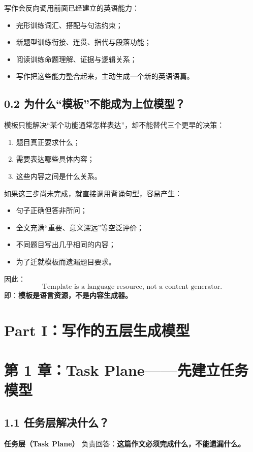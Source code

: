 \documentclass[11pt,a4paper]{ctexart}
\newcommand{\kw}[1]{\textbf{#1}}
\newcommand{\term}[2]{\textbf{#1（#2）}}
\begin{document}
\begin{bridge}[与阅读类专题的接口]
写作会反向调用前面已经建立的英语能力：
\begin{itemize}
  \item 完形训练词汇、搭配与句法约束；
  \item 新题型训练衔接、连贯、指代与段落功能；
  \item 阅读训练命题理解、证据与逻辑关系；
  \item 写作把这些能力整合起来，主动生成一个新的英语语篇。
\end{itemize}
\end{bridge}

\subsection{0.2 为什么“模板”不能成为上位模型？}
模板只能解决“某个功能通常怎样表达”，却不能替代三个更早的决策：
\begin{enumerate}
  \item 题目真正要求什么；
  \item 需要表达哪些具体内容；
  \item 这些内容之间是什么关系。
\end{enumerate}
如果这三步尚未完成，就直接调用背诵句型，容易产生：
\begin{itemize}
  \item 句子正确但答非所问；
  \item 全文充满“重要、意义深远”等空泛评价；
  \item 不同题目写出几乎相同的内容；
  \item 为了迁就模板而遗漏题目要求。
\end{itemize}
因此：
\[
\boxed{
\text{Template is a language resource, not a content generator.}
}
\]
即：\kw{模板是语言资源，不是内容生成器。}

\newpage
\section{Part I：写作的五层生成模型}

\section{第 1 章：Task Plane——先建立任务模型}

\subsection{1.1 任务层解决什么？}
\term{任务层}{Task Plane} 负责回答：\kw{这篇作文必须完成什么，不能遗漏什么。}
\end{document}
